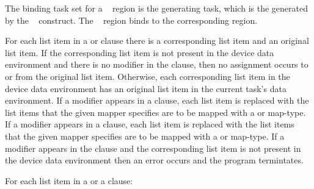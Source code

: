 \binding
The binding task set for a ~ region is the
generating task, which is the  generated
by the ~ construct. The ~
region binds to the corresponding  region.

\descr
For each list item in a  or  clause there is a corresponding 
list item and an original list item. If the corresponding list item is not present 
in the device data environment and there is no  modifier in the clause,
then no assignment occurs to or from the original list item.  
Otherwise, each corresponding list item in the device data environment 
has an original list item in the current task's data environment.  If a 
 modifier appears in a  clause, each list item is replaced 
with the list items that the given mapper specifies are to be mapped
with a  or  map-type. If a  modifier
appears in a  clause, each list item is replaced with the list items
that the given mapper specifies are to be mapped with a  or
 map-type. If a  modifier
appears in the clause and the corresponding list item is not present in the device data
environment then an error occurs and the program termintates.

For each list item in a  or a  clause: 

